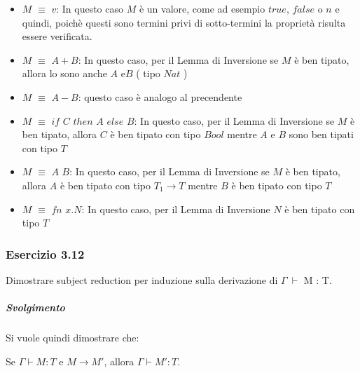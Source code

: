 
 \begin{itemize}[label=$\star$]

 \item $M$ $\equiv$ $v$:  In questo caso $M$ \`e un valore, come ad esempio $true$, $false$ o $n$ e quindi, poich\`e questi sono termini privi di sotto-termini la propriet\`a risulta essere verificata.

 \item $M$ $\equiv$ $A+B$:  In questo caso, per il Lemma di Inversione se $M$ \`e ben tipato, allora lo sono anche $A$ e$B$ ( tipo $Nat$ )
 
 \item $M$ $\equiv$ $A-B$:  questo caso \`e analogo al precendente

 \item $M$ $\equiv$ $if$ $C$ $then$ $A$ $else$ $B$:  In questo caso, per il Lemma di Inversione se $M$ \`e ben tipato, allora $C$ \`e ben tipato con tipo $Bool$ mentre $A$ e $B$ sono ben tipati con tipo $T$
 
  \item $M$ $\equiv$ $A$ $B$: In questo caso, per il Lemma di Inversione se $M$ \`e ben tipato, allora $A$ \`e ben tipato con tipo $T_1 \rightarrow T$ mentre $B$ \`e ben tipato con tipo $T$
  
    \item $M$ $\equiv$ $fn$ $x.N$: In questo caso, per il Lemma di Inversione $N$ \`e ben tipato con tipo $T$
 \end{itemize}
 
 
\subsubsection*{Esercizio 3.12} 
Dimostrare subject reduction per induzione sulla derivazione di $\Gamma\:\vdash$ M : T.

\subparagraph*{Svolgimento}

Si vuole quindi dimostrare che:

\begin{center}
	Se $\Gamma \vdash{} M : T$ e $M \to{} M'$, allora $\Gamma \vdash{} M' : T$.
\end{center}



